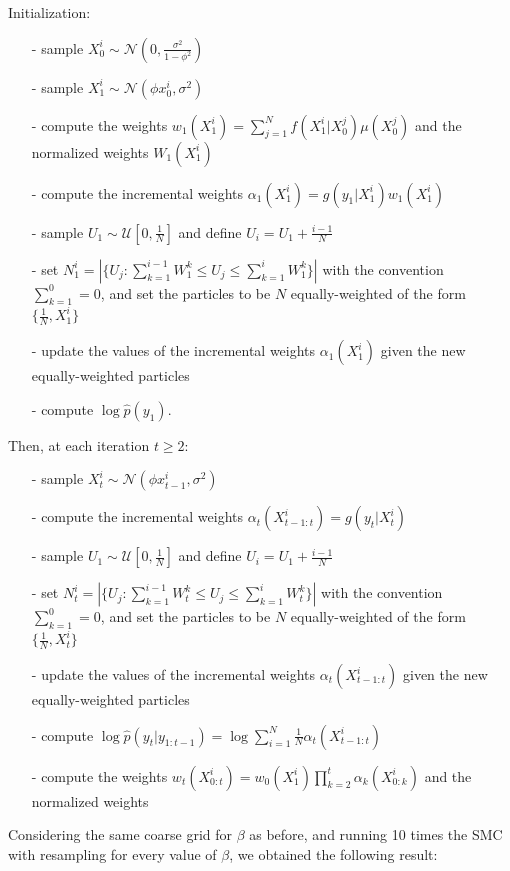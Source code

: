 \documentclass[]{article}
\begin{document}
Initialization:
\begin{enumerate}
	\item[-] sample $X_0^i \sim \mathcal{N}(0, \frac{\sigma^2}{1-\phi^2})$
	\item[-] sample $X_1^i \sim \mathcal{N}(\phi x_0^i,\sigma^2) $ 
	\item[-] compute the weights $w_1(X_1^i) = \sum_{j=1}^{N}f(X_1^i|X_0^j)\mu(X_0^j)$ and the normalized weights $W_1(X_1^i)$
	\item[-] compute the incremental weights $ \alpha_1(X_1^i) = g(y_1|X_1^i)w_1(X_1^i) $
	\item[-] sample $U_1 \sim \mathcal{U}[0, \frac{1}{N}]$ and define $U_i = U_1 + \frac{i-1}{N}$
	\item[-] set $N_1^i = |\{ U_j: \sum_{k=1}^{i-1}W_1^k \leq U_j \leq \sum_{k=1}^{i}W_1^k \}|$ with the convention $\sum_{k=1}^{0}=0$, and set the particles to be $N$ equally-weighted of the form $\{\frac{1}{N}, X_1^i\}$
	\item[-] update the values of the incremental weights  $ \alpha_1(X_1^i) $ given the new equally-weighted particles
	\item[-] compute $\log \hat{p}(y_1)$. 
\end{enumerate}
Then, at each iteration $t \geq 2$:
\begin{enumerate}
	\item[-] sample $X_t^i \sim \mathcal{N}(\phi x_{t-1}^i,\sigma^2) $
	\item[-] compute the incremental weights $ \alpha_t(X_{t-1:t}^i) = g(y_t|X_t^i) $
	\item[-] sample $U_1 \sim \mathcal{U}[0, \frac{1}{N}]$ and define $U_i = U_1 + \frac{i-1}{N}$
	\item[-] set $N_t^i = |\{ U_j: \sum_{k=1}^{i-1}W_t^k \leq U_j \leq \sum_{k=1}^{i}W_t^k \}|$ with the convention $\sum_{k=1}^{0}=0$, and set the particles to be $N$ equally-weighted of the form $\{\frac{1}{N}, X_t^i\}$
	\item[-] update the values of the incremental weights  $ \alpha_t(X_{t-1:t}^i) $ given the new equally-weighted particles
	\item[-] compute $\log \hat{p}(y_t|y_{1:t-1})=\log\sum_{i=1}^{N}\frac{1}{N}\alpha_t(X_{t-1:t}^i)$
	\item[-] compute the weights $
	w_t(X_{0:t}^i)=w_0(X_1^i)\prod_{k=2}^{t}\alpha_k(X_{0:k}^i)$ and the normalized weights
\end{enumerate}
Considering the same coarse grid for $\beta$ as before, and running 10 times the SMC with resampling for every value of $\beta$, we obtained the following result:
\end{document}

